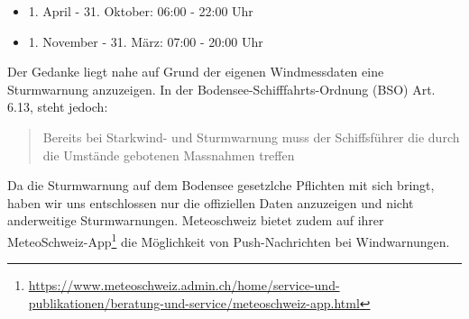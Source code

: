 \begin{itemize}
\item 1. April - 31. Oktober: 06:00 - 22:00 Uhr
\item 1. November - 31. März: 07:00 - 20:00 Uhr
\end{itemize}

\noindent
Der Gedanke liegt nahe auf Grund der eigenen Windmessdaten eine Sturmwarnung anzuzeigen. In der Bodensee-Schifffahrts-Ordnung (BSO) Art. 6.13, steht jedoch:

\begin{quote}
\flqq Bereits bei Starkwind- und Sturmwarnung muss der Schiffsführer die durch die Umstände gebotenen Massnahmen treffen \frqq
\end{quote}

\noindent
 Da die Sturmwarnung auf dem Bodensee gesetzlche Pflichten mit sich bringt, haben wir uns entschlossen nur die offiziellen Daten anzuzeigen und nicht anderweitige Sturmwarnungen. Meteoschweiz bietet zudem auf ihrer MeteoSchweiz-App\footnote{ \url{https://www.meteoschweiz.admin.ch/home/service-und-publikationen/beratung-und-service/meteoschweiz-app.html}} die Möglichkeit von Push-Nachrichten bei Windwarnungen.








